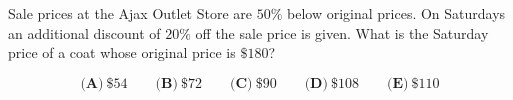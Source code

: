 

Sale prices at the Ajax Outlet Store are $ 50 \%$ below original prices. On Saturdays an additional discount of $ 20 \%$ off the sale price is given. What is the Saturday price of a coat whose original price is $ \$180$?

\[ \textbf{(A)}\ \$54 \qquad
\textbf{(B)}\ \$72 \qquad
\textbf{(C)}\ \$90 \qquad
\textbf{(D)}\ \$108 \qquad
\textbf{(E)}\ \$110
\]